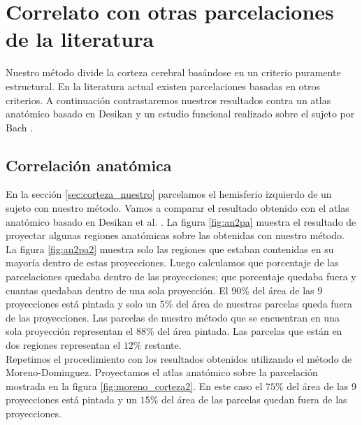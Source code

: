 \section{Correlato con otras parcelaciones de la literatura}
\label{sec:res_correlato}

Nuestro m\'etodo divide la corteza cerebral bas\'andose en un criterio
puramente estructural. En la literatura actual existen parcelaciones
basadas en otros criterios. A continuaci\'on contrastaremos nuestros 
resultados contra un atlas anat\'omico basado en Desikan \cite{Desikan2006}
y un estudio funcional realizado sobre el sujeto por Bach \cite{Barch2013}.

\subsection{Correlaci\'on anat\'omica}
\label{sec:corr_anatomica}

En la secci\'on \ref{sec:corteza_nuestro} parcelamos el hemisferio 
izquierdo de un sujeto con nuestro m\'etodo. Vamos a comparar el resultado
obtenido con el atlas anat\'omico basado en Desikan et al. 
\cite{Desikan2006}. La figura \ref{fig:an2pa} muestra el resultado de
proyectar algunas regiones anat\'omicas sobre las obtenidas con nuestro
m\'etodo. La figura \ref{fig:an2pa2} muestra solo las regiones que estaban
contenidas en su mayor\'ia dentro de estas proyecciones. Luego calculamos
que porcentaje de las parcelaciones quedaba dentro de las proyecciones;
que porcentaje quedaba fuera y cuantas quedaban dentro de una sola 
proyecci\'on. El $90\%$ del \'area de las 9 proyecciones est\'a pintada y
solo un $5\%$ del \'area de nuestras parcelas queda fuera de las
proyecciones. Las parcelas de nuestro m\'etodo que se encuentran en una
sola proyecci\'on representan el $88\%$ del \'area pintada. Las parcelas
que est\'an en dos regiones representan el $12\%$ restante. \\

Repetimos el procedimiento con los resultados obtenidos utilizando el 
m\'etodo de Moreno-Dominguez. Proyectamos el atlas anat\'omico sobre la
parcelaci\'on mostrada en la figura \ref{fig:moreno_corteza2}.
En este caso el $75\%$ del \'area de las 9 proyecciones est\'a pintada y 
un $15\%$ del \'area de las parcelas quedan fuera de las proyecciones. \\

